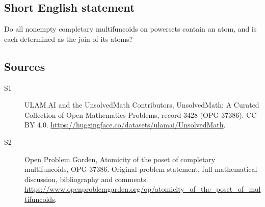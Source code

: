 \documentclass[11pt]{article}
\begin{document}
\subsection{Short English statement}
Do all nonempty completary multifuncoids on powersets contain an atom, and is each determined as the join of its atoms?
\subsection{Sources}
\begin{description}
\item[\hypertarget{source:3428:1}{S1}] ULAM.AI and the UnsolvedMath Contributors, UnsolvedMath: A Curated Collection of Open Mathematics Problems, record 3428 (OPG-37386). CC BY 4.0. \url{https://huggingface.co/datasets/ulamai/UnsolvedMath}.
\item[\hypertarget{source:3428:2}{S2}] Open Problem Garden, Atomicity of the poset of completary multifuncoids, OPG-37386. Original problem statement, full mathematical discussion, bibliography and comments. \url{https://www.openproblemgarden.org/op/atomicity_of_the_poset_of_multifuncoids}.
\end{description}
\label{end:3428}
\end{document}
